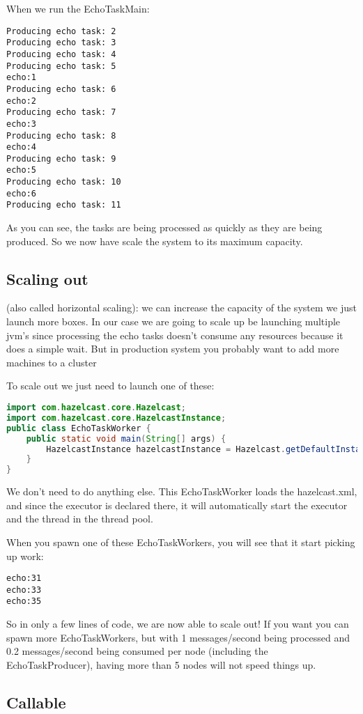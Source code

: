 When we run the EchoTaskMain:
\begin{verbatim}
Producing echo task: 2
Producing echo task: 3
Producing echo task: 4
Producing echo task: 5
echo:1
Producing echo task: 6
echo:2
Producing echo task: 7
echo:3
Producing echo task: 8
echo:4
Producing echo task: 9
echo:5
Producing echo task: 10
echo:6
Producing echo task: 11	
\end{verbatim}
As you can see, the tasks are being processed as quickly as they are being produced. So we now have scale the system to its maximum capacity.

\subsection{Scaling out}
(also called horizontal scaling): we can increase the capacity of the system we just launch more boxes. In our case we are going to scale up be launching multiple jvm's since processing the echo tasks doesn't consume any resources because it does a simple wait. But in production system you probably want to add more machines to a cluster

To scale out we just need to launch one of these:

\begin{lstlisting}[language=java]
import com.hazelcast.core.Hazelcast;
import com.hazelcast.core.HazelcastInstance;
public class EchoTaskWorker {
    public static void main(String[] args) {
        HazelcastInstance hazelcastInstance = Hazelcast.getDefaultInstance();
    }
}
\end{lstlisting}
We don't need to do anything else. This EchoTaskWorker loads the hazelcast.xml, and since the executor is declared there, it will automatically start the executor and the thread in the thread pool. 


When you spawn one of these EchoTaskWorkers, you will see that it start picking up work:
\begin{verbatim}
echo:31
echo:33
echo:35	
\end{verbatim}
So in only a few lines of code, we are now able to scale out! If you want you can spawn more EchoTaskWorkers, but with 1 messages/second being processed and 0.2 messages/second being consumed per node (including the EchoTaskProducer), having more than 5 nodes will not speed things up.

\subsection{Callable}

